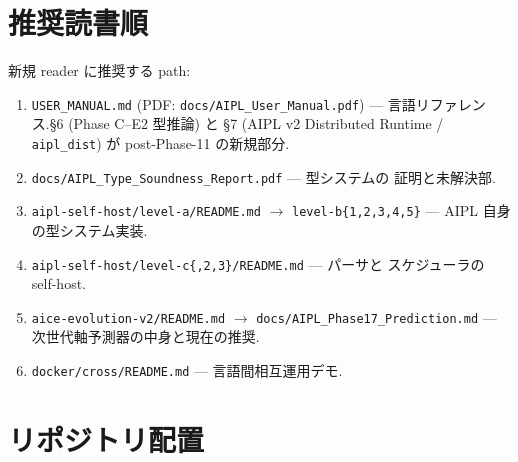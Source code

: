 \documentclass[11pt,a4paper]{article}
\begin{document}
\section{推奨読書順}

新規 reader に推奨する path:

\begin{enumerate}\setlength{\itemsep}{0pt}
\item \texttt{USER\_MANUAL.md} (PDF: \texttt{docs/AIPL\_User\_Manual.pdf}) ---
       言語リファレンス.§6 (Phase C--E2 型推論) と §7 (AIPL v2 Distributed
       Runtime / \texttt{aipl\_dist}) が post-Phase-11 の新規部分.
\item \texttt{docs/AIPL\_Type\_Soundness\_Report.pdf} --- 型システムの
       証明と未解決部.
\item \texttt{aipl-self-host/level-a/README.md} $\to$ \texttt{level-b\{1,2,3,4,5\}} ---
       AIPL 自身の型システム実装.
\item \texttt{aipl-self-host/level-c\{,2,3\}/README.md} --- パーサと
       スケジューラの self-host.
\item \texttt{aice-evolution-v2/README.md} $\to$ \texttt{docs/AIPL\_Phase17\_Prediction.md} ---
       次世代軸予測器の中身と現在の推奨.
\item \texttt{docker/cross/README.md} --- 言語間相互運用デモ.
\end{enumerate}

\section{リポジトリ配置}
\end{document}
